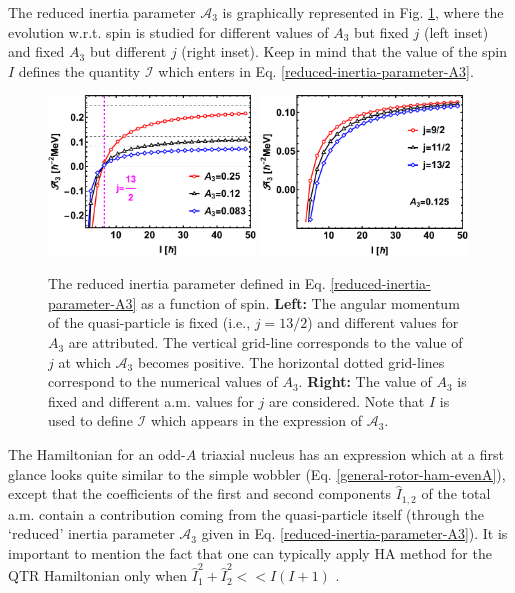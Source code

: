 The reduced inertia parameter $\mathscr{A}_3$ is graphically represented in Fig. \ref{reduced-inertia-A3-figs}, where the evolution w.r.t. spin is studied for different values of $A_3$ but fixed $j$ (left inset) and fixed $A_3$ but different $j$ (right inset). Keep in mind that the value of the spin $I$ defines the quantity $\mathscr{I}$ which enters in Eq. \ref{reduced-inertia-parameter-A3}.
\begin{figure}
    \centering
    \includegraphics[width=0.49\textwidth]{Chapters/Figures/reducedInertia_fig1.pdf}
    \includegraphics[width=0.49\textwidth]{Chapters/Figures/reducedInertia_fig2.pdf}
    \caption{The reduced inertia parameter defined in Eq. \ref{reduced-inertia-parameter-A3} as a function of spin. \textbf{Left:} The angular momentum of the quasi-particle is fixed (i.e., $j=13/2$) and different values for $A_3$ are attributed. The vertical grid-line corresponds to the value of $j$ at which $\mathscr{A}_3$ becomes positive. The horizontal dotted grid-lines correspond to the numerical values of $A_3$. \textbf{Right:} The value of $A_3$ is fixed and different a.m. values for $j$ are considered. Note that $I$ is used to define $\mathscr{I}$ which appears in the expression of $\mathscr{A}_3$.}
    \label{reduced-inertia-A3-figs}
\end{figure}

The Hamiltonian for an odd-$A$ triaxial nucleus has an expression which at a first glance looks quite similar to the simple wobbler (Eq. \ref{general-rotor-ham-evenA}), except that the coefficients of the first and second components $\hat{I}_{1,2}$ of the total a.m. contain a contribution coming from the quasi-particle itself (through the `reduced' inertia parameter $\mathscr{A}_3$ given in Eq. \ref{reduced-inertia-parameter-A3}). It is important to mention the fact that one can typically apply HA method for the QTR Hamiltonian only when $\hat{I}_1^2+\hat{I}_2^2<<I(I+1)$ \cite{bohr1998nuclear,frauendorf2014transverse}.

